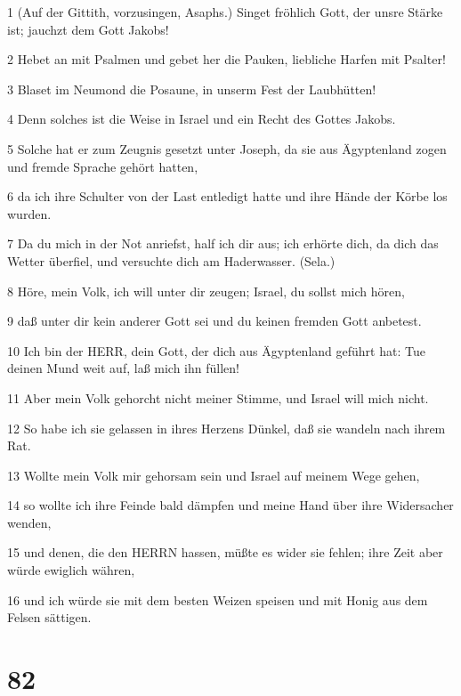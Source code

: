 \par 1 (Auf der Gittith, vorzusingen, Asaphs.) Singet fröhlich Gott, der unsre Stärke ist; jauchzt dem Gott Jakobs!
\par 2 Hebet an mit Psalmen und gebet her die Pauken, liebliche Harfen mit Psalter!
\par 3 Blaset im Neumond die Posaune, in unserm Fest der Laubhütten!
\par 4 Denn solches ist die Weise in Israel und ein Recht des Gottes Jakobs.
\par 5 Solche hat er zum Zeugnis gesetzt unter Joseph, da sie aus Ägyptenland zogen und fremde Sprache gehört hatten,
\par 6 da ich ihre Schulter von der Last entledigt hatte und ihre Hände der Körbe los wurden.
\par 7 Da du mich in der Not anriefst, half ich dir aus; ich erhörte dich, da dich das Wetter überfiel, und versuchte dich am Haderwasser. (Sela.)
\par 8 Höre, mein Volk, ich will unter dir zeugen; Israel, du sollst mich hören,
\par 9 daß unter dir kein anderer Gott sei und du keinen fremden Gott anbetest.
\par 10 Ich bin der HERR, dein Gott, der dich aus Ägyptenland geführt hat: Tue deinen Mund weit auf, laß mich ihn füllen!
\par 11 Aber mein Volk gehorcht nicht meiner Stimme, und Israel will mich nicht.
\par 12 So habe ich sie gelassen in ihres Herzens Dünkel, daß sie wandeln nach ihrem Rat.
\par 13 Wollte mein Volk mir gehorsam sein und Israel auf meinem Wege gehen,
\par 14 so wollte ich ihre Feinde bald dämpfen und meine Hand über ihre Widersacher wenden,
\par 15 und denen, die den HERRN hassen, müßte es wider sie fehlen; ihre Zeit aber würde ewiglich währen,
\par 16 und ich würde sie mit dem besten Weizen speisen und mit Honig aus dem Felsen sättigen.

\chapter{82}

